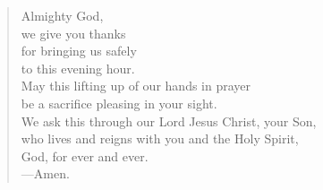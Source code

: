 \prayer

\setlength{\vleftmargin}{\prayerleftmargini}

\begin{verse}
Almighty God,\\
we give you thanks\\
for bringing us safely\\
to this evening hour.\\
May this lifting up of our hands in prayer\\
be a sacrifice pleasing in your sight.\\
We ask this through our Lord Jesus Christ, your Son,\\
who lives and reigns with you and the Holy Spirit,\\
God, for ever and ever.\\
{\color{red}---\thinspace}Amen.
\end{verse}

\setlength{\vleftmargin}{\defleftmargini}